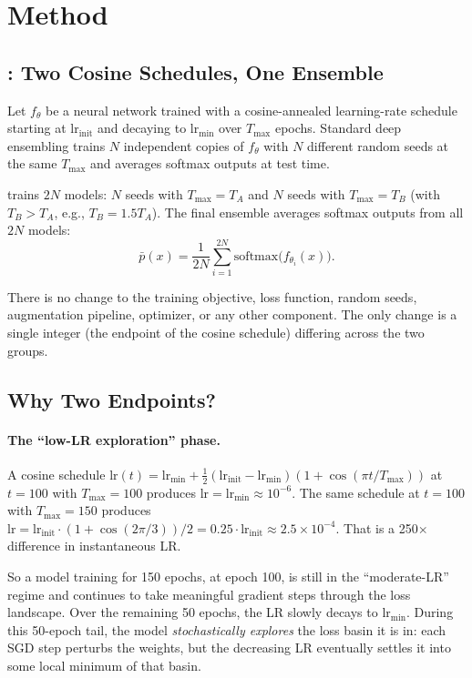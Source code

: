 \section{Method}
\label{sec:method}

\subsection{\ours{}: Two Cosine Schedules, One Ensemble}

Let $f_\theta$ be a neural network trained with a cosine-annealed
learning-rate schedule starting at $\mathrm{lr}_{\mathrm{init}}$ and
decaying to $\mathrm{lr}_{\mathrm{min}}$ over $T_\mathrm{max}$ epochs.
Standard deep ensembling trains $N$ independent copies of $f_\theta$ with
$N$ different random seeds at the same $T_\mathrm{max}$ and averages softmax
outputs at test time.

\ours{} trains $2N$ models: $N$ seeds with $T_\mathrm{max}=T_A$ and $N$
seeds with $T_\mathrm{max}=T_B$ (with $T_B > T_A$, e.g., $T_B = 1.5 T_A$).
The final ensemble averages softmax outputs from all $2N$ models:
\[
\bar p(x) = \frac{1}{2N}\sum_{i=1}^{2N} \mathrm{softmax}\!\bigl(f_{\theta_i}(x)\bigr).
\]

There is no change to the training objective, loss function, random seeds,
augmentation pipeline, optimizer, or any other component. The only change
is a single integer (the endpoint of the cosine schedule) differing across
the two groups.

\subsection{Why Two Endpoints?}

\paragraph{The ``low-LR exploration'' phase.}
A cosine schedule $\mathrm{lr}(t) = \mathrm{lr}_{\mathrm{min}} +
\frac{1}{2}(\mathrm{lr}_{\mathrm{init}} - \mathrm{lr}_{\mathrm{min}})(1 + \cos(\pi t / T_{\max}))$
at $t=100$ with $T_\mathrm{max}=100$ produces
$\mathrm{lr}=\mathrm{lr}_{\mathrm{min}} \approx 10^{-6}$. The same schedule at
$t=100$ with $T_\mathrm{max}=150$ produces
$\mathrm{lr} = \mathrm{lr}_{\mathrm{init}} \cdot (1 + \cos(2\pi/3))/2 = 0.25 \cdot \mathrm{lr}_{\mathrm{init}} \approx 2.5 \times 10^{-4}$.
That is a 250$\times$ difference in instantaneous LR.

So a model training for 150 epochs, at epoch 100, is still in the
``moderate-LR'' regime and continues to take meaningful gradient steps
through the loss landscape. Over the remaining 50 epochs, the LR slowly
decays to $\mathrm{lr}_{\mathrm{min}}$. During this 50-epoch tail, the
model \emph{stochastically explores} the loss basin it is in: each SGD
step perturbs the weights, but the decreasing LR eventually settles it
into some local minimum of that basin.

